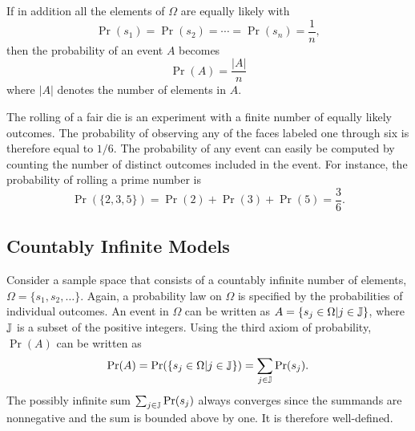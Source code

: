If in addition all the elements of $\Omega$ are equally likely with
\begin{equation*}
\Pr (s_1) = \Pr (s_2) = \cdots = \Pr (s_n) = \frac{1}{n} ,
\end{equation*}
then the probability of an event $A$ becomes
\begin{equation} \label{equation:ProbEquiProbableOutcomes}
\Pr (A) = \frac{ |A| }{n}
\end{equation}
where $|A|$ denotes the number of elements in $A$.

\begin{example}
The rolling of a fair die is an experiment with a finite number of equally likely outcomes.
The probability of observing any of the faces labeled one through six is therefore equal to $1/6$.
The probability of any event can easily be computed by counting the number of distinct outcomes included in the event.
For instance, the probability of rolling a prime number is
\begin{equation*}
\Pr ( \{ 2, 3, 5 \} )
= \Pr (2) + \Pr(3) + \Pr(5) = \frac{3}{6} .
\end{equation*}
\end{example}


\subsection{Countably Infinite Models}

Consider a sample space that consists of a countably infinite number of elements, $\Omega = \{ s_1, s_2, \ldots \}$.
Again, a probability law on $\Omega$ is specified by the probabilities of individual outcomes.
An event in $\Omega$ can be written as $A = \{ s_j \in \Omega | j \in \mathbb{J} \}$, where $\mathbb{J}$ is a subset of the positive integers.
Using the third axiom of probability, $\Pr (A)$ can be written as
\begin{equation*}
\Pr (A)
= \Pr ( \{ s_j \in \Omega | j \in \mathbb{J} \} )
= \sum_{j \in \mathbb{J}} \Pr (s_j) .
\end{equation*}
The possibly infinite sum $\sum_{j \in \mathbb{J}} \Pr (s_j)$ always converges since the summands are nonnegative and the sum is bounded above by one.
It is therefore well-defined.

